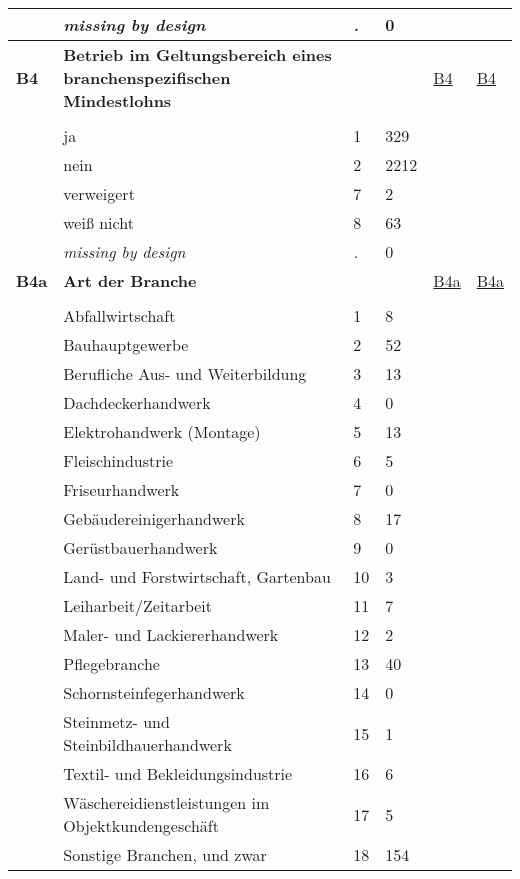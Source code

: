 \begin{longtable}{| L{2.45cm} | L{6cm} | C{1.5cm} | R{1cm} | C{2.25cm} | C{2.25cm} |}
   & \textit{missing by design} & \textit{.} & 0 &  &  \\ 
   \midrule
\textbf{B4}\label{var:B4} & \textbf{Betrieb im Geltungsbereich eines branchenspezifischen Mindestlohns} &  &  & \hyperref[B4]{B4} & \hyperref[var:suf:B4]{B4} \\ 
   &  &  &  &  &  \\ 
   & ja & 1 & 329 &  &  \\ 
   & nein & 2 & 2212 &  &  \\ 
   & verweigert & 7 & 2 &  &  \\ 
   & weiß nicht & 8 & 63 &  &  \\ 
   & \textit{missing by design} & \textit{.} & 0 &  &  \\ 
   \midrule
\textbf{B4a}\label{var:B4a} & \textbf{Art der Branche} &  &  & \hyperref[B4a]{B4a} & \hyperref[var:suf:B4a]{B4a} \\ 
   &  &  &  &  &  \\ 
   & Abfallwirtschaft & 1 & 8 &  &  \\ 
   & Bauhauptgewerbe & 2 & 52 &  &  \\ 
   & Berufliche Aus- und Weiterbildung & 3 & 13 &  &  \\ 
   & Dachdeckerhandwerk & 4 & 0 &  &  \\ 
   & Elektrohandwerk (Montage) & 5 & 13 &  &  \\ 
   & Fleischindustrie & 6 & 5 &  &  \\ 
   & Friseurhandwerk & 7 & 0 &  &  \\ 
   & Gebäudereinigerhandwerk & 8 & 17 &  &  \\ 
   & Gerüstbauerhandwerk & 9 & 0 &  &  \\ 
   & Land- und Forstwirtschaft, Gartenbau & 10 & 3 &  &  \\ 
   & Leiharbeit/Zeitarbeit & 11 & 7 &  &  \\ 
   & Maler- und Lackiererhandwerk & 12 & 2 &  &  \\ 
   & Pflegebranche & 13 & 40 &  &  \\ 
   & Schornsteinfegerhandwerk & 14 & 0 &  &  \\ 
   & Steinmetz- und Steinbildhauerhandwerk & 15 & 1 &  &  \\ 
   & Textil- und Bekleidungsindustrie & 16 & 6 &  &  \\ 
   & Wäschereidienstleistungen im Objektkundengeschäft & 17 & 5 &  &  \\ 
   & Sonstige Branchen, und zwar & 18 & 154 &  &  \\ 

\end{longtable}
